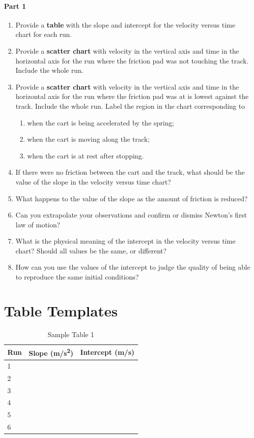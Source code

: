 \paragraph{Part 1}
%
\begin{enumerate}
    \item Provide a \textbf{table} with the slope and intercept for the velocity versus time chart for each run.
    \item Provide a \textbf{scatter chart} with velocity in the vertical axis and time in the horizontal axis for the run where the friction pad was not touching the track. Include the whole run.
    \item Provide a \textbf{scatter chart} with velocity in the vertical axis and time in the horizontal axis for the run where the friction pad was at is lowest against the track. Include the whole run. Label the region in the chart corresponding to
    \begin{enumerate}
        \item when the cart is being accelerated by the spring;
        \item when the cart is moving along the track;
        \item when the cart is at rest after stopping.
    \end{enumerate}
    \item If there were no friction between the cart and the track, what should be the value of the slope in the velocity versus time chart?
    \item What happens to the value of the slope as the amount of friction is reduced?
    \item Can you extrapolate your observations and confirm or dismiss Newton's first law of motion?
    \item What is the physical meaning of the intercept in the velocity versus time chart? Should all values be the same, or different?
    \item How can you use the values of the intercept to judge the quality of being able to reproduce the same initial conditions?
\end{enumerate}
%
\newpage
\section{Table Templates}
%
\begin{table}[ht!]
    \begin{center}
        \begin{tabular}{l | l | l}
            \textbf{Run} & \textbf{Slope} (m/s\textsuperscript{2}) & \textbf{Intercept} (m/s) \\
            \hline
            1 & & \\
            2 & & \\
            3 & & \\
            4 & & \\
            5 & & \\
            6 & & \\
            \hline
        \end{tabular}
    \end{center}
    \caption{Sample Table 1}
\end{table}
%
\newpage
